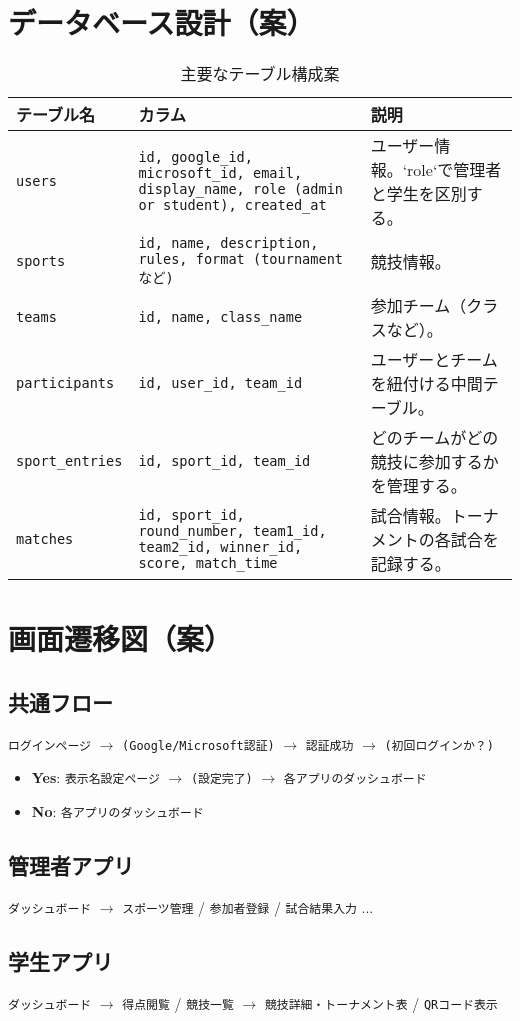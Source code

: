 \documentclass[12pt]{ltjsarticle} %
\begin{document}
\section{データベース設計（案）}

\begin{table}[H]
    \centering
    \caption{主要なテーブル構成案}
    \label{tab:db_schema}
    \begin{tabular}{lp{6cm}p{6cm}}
        \toprule
        \textbf{テーブル名} & \textbf{カラム} & \textbf{説明} \\
        \midrule
        \texttt{users} & \texttt{id, google\_id, microsoft\_id, email, display\_name, role (admin or student), created\_at} & ユーザー情報。`role`で管理者と学生を区別する。 \\
        \addlinespace
        \texttt{sports} & \texttt{id, name, description, rules, format (tournamentなど)} & 競技情報。 \\
        \addlinespace
        \texttt{teams} & \texttt{id, name, class\_name} & 参加チーム（クラスなど）。 \\
        \addlinespace
        \texttt{participants} & \texttt{id, user\_id, team\_id} & ユーザーとチームを紐付ける中間テーブル。 \\
        \addlinespace
        \texttt{sport\_entries} & \texttt{id, sport\_id, team\_id} & どのチームがどの競技に参加するかを管理する。 \\
        \addlinespace
        \texttt{matches} & \texttt{id, sport\_id, round\_number, team1\_id, team2\_id, winner\_id, score, match\_time} & 試合情報。トーナメントの各試合を記録する。 \\
        \bottomrule
    \end{tabular}
\end{table}

\section{画面遷移図（案）}

\subsection{共通フロー}
\texttt{ログインページ} $\rightarrow$ \texttt{(Google/Microsoft認証)} $\rightarrow$ \texttt{認証成功} $\rightarrow$ \texttt{(初回ログインか？)}
\begin{itemize}
    \item \textbf{Yes}: \texttt{表示名設定ページ} $\rightarrow$ \texttt{(設定完了)} $\rightarrow$ \texttt{各アプリのダッシュボード}
    \item \textbf{No}: \texttt{各アプリのダッシュボード}
\end{itemize}

\subsection{管理者アプリ}
\texttt{ダッシュボード} $\rightarrow$ \texttt{スポーツ管理} / \texttt{参加者登録} / \texttt{試合結果入力} ...

\subsection{学生アプリ}
\texttt{ダッシュボード} $\rightarrow$ \texttt{得点閲覧} / \texttt{競技一覧} $\rightarrow$ \texttt{競技詳細・トーナメント表} / \texttt{QRコード表示}
\end{document}
